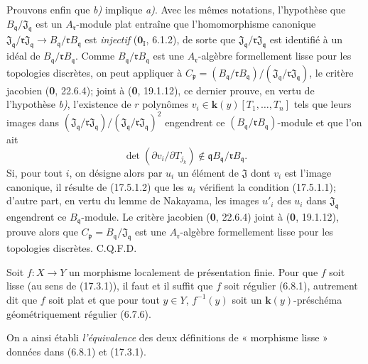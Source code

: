 Prouvons enfin que \emph{b)} implique \emph{a)}. Avec les mêmes notations, l'hypothèse que $B_{\mathfrak q}/\mathfrak J_{\mathfrak q}$ est un $A_{\mathfrak r}$-module plat entraîne que l'homomorphisme canonique $\mathfrak J_{\mathfrak q}/\mathfrak r\mathfrak J_{\mathfrak q}\to B_{\mathfrak q}/\mathfrak rB_{\mathfrak q}$ est \emph{injectif} ($\mathbf{0}_{\mathrm I}$, 6.1.2), de sorte que $\mathfrak J_{\mathfrak q}/\mathfrak r\mathfrak J_{\mathfrak q}$ est identifié à un idéal de $B_{\mathfrak q}/\mathfrak rB_{\mathfrak q}$. Comme $B_{\mathfrak q}/\mathfrak rB_{\mathfrak q}$ est une $A_{\mathfrak r}$-algèbre formellement lisse pour les topologies discrètes, on peut appliquer à $C_{\mathfrak p}=(B_{\mathfrak q}/\mathfrak rB_{\mathfrak q})/(\mathfrak J_{\mathfrak q}/\mathfrak r\mathfrak J_{\mathfrak q})$, le critère jacobien (\textbf{0}, 22.6.4); joint à (\textbf{0}, 19.1.12), ce dernier prouve, en vertu de l'hypothèse \emph{b)}, l'existence de $r$ polynômes $v_i\in\boldsymbol{k}(y)[T_1,\ldots,T_n]$ tels que leurs images dans $(\mathfrak J_{\mathfrak q}/\mathfrak r\mathfrak J_{\mathfrak q})/(\mathfrak J_{\mathfrak q}/\mathfrak r\mathfrak J_{\mathfrak q})^2$ engendrent ce $(B_{\mathfrak q}/\mathfrak rB_{\mathfrak q})$-module et que l'on ait
\[
\label{IV.17.5.1.2}
\det(\partial v_i/\partial T_{j_k})\notin\mathfrak qB_{\mathfrak q}/\mathfrak rB_{\mathfrak q}.
\tag{17.5.1.2}
\]
Si, pour tout $i$, on désigne alors par $u_i$ un élément de $\mathfrak J$ dont $v_i$ est l'image canonique, il résulte de (17.5.1.2) que les $u_i$ vérifient la condition (17.5.1.1); d'autre part, en vertu du lemme de Nakayama, les images $u'_i$ des $u_i$ dans $\mathfrak J_{\mathfrak q}$ engendrent ce $B_{\mathfrak q}$-module. Le critère jacobien (\textbf{0}, 22.6.4) joint à (\textbf{0}, 19.1.12), prouve alors que $C_{\mathfrak p}=B_{\mathfrak q}/\mathfrak J_{\mathfrak q}$ est une $A_{\mathfrak r}$-algèbre formellement lisse pour les topologies discrètes. C.Q.F.D.

\begin{corollary}[17.5.2]
\label{IV.17.5.2}
Soit $f:X\to Y$ un morphisme localement de présentation finie. Pour que $f$ soit lisse \textup{(}au sens de \textup{(17.3.1))}, il faut et il suffit que $f$ soit régulier \textup{(6.8.1)}, autrement dit que $f$ soit plat et que pour tout $y\in Y$, $f^{-1}(y)$ soit un $\boldsymbol{k}(y)$-préschéma géométriquement régulier \textup{(6.7.6)}.
\end{corollary}

On a ainsi établi \emph{l'équivalence} des deux définitions de « morphisme lisse » données dans (6.8.1) et (17.3.1).

